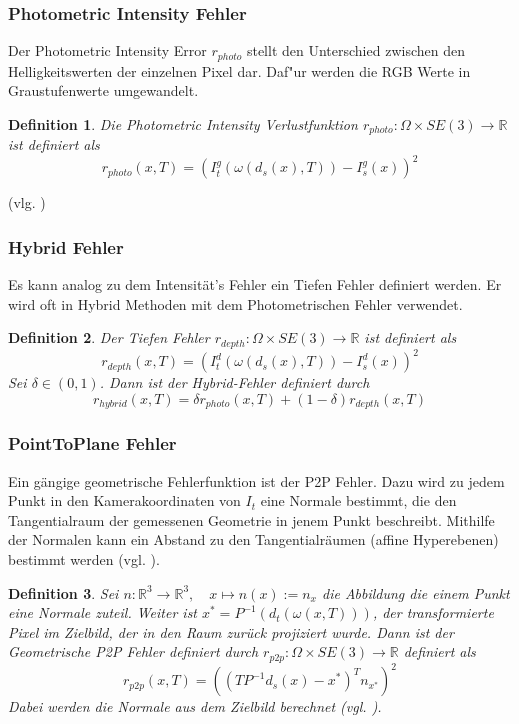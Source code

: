 \documentclass[12pt,DIV=15,BCOR=15mm,twoside,headsepline,abstract=true,listof=totoc,bibliography=totoc]{scrreprt}
\newtheorem{defi}{Definition}
\theoremstyle{remark}    %
\begin{document}
    \subsubsection{Photometric Intensity Fehler}
    
    Der Photometric Intensity Error $r_{photo}$ stellt den Unterschied zwischen den Helligkeitswerten der einzelnen Pixel dar. Daf"ur werden die RGB Werte
    in Graustufenwerte umgewandelt.
    \begin{defi}
        Die Photometric Intensity Verlustfunktion $r_{photo}:\Omega \times SE(3) \to \mathbb{R}$ ist definiert als 
        \[
        r_{photo}(x, T) = ( I_t^g(\omega(d_s(x), T)) - I_s^g(x))^2
        \]
    \end{defi} \noindent (vlg. \cite{Park_2017_ICCV,steinbruecker2011real})

    \subsubsection{Hybrid Fehler}
    Es kann analog zu dem Intensität's Fehler ein Tiefen Fehler definiert werden. Er wird oft in Hybrid Methoden mit dem Photometrischen Fehler verwendet. 
    \begin{defi}
        Der Tiefen Fehler $r_{depth}:\Omega \times SE(3) \to \mathbb{R}$ ist definiert als
        \[
            r_{depth}(x,T)= (I_t^d(\omega(d_s(x), T)) - I_s^d(x))^2
        \]
        Sei $\delta \in (0,1)$. Dann ist der Hybrid-Fehler definiert durch 
        \[
            r_{hybrid}(x,T)= \delta r_{photo}(x, T) + (1-\delta)r_{depth}(x,T)
        \]
    \end{defi} 
    
    \subsubsection{PointToPlane Fehler}
    Ein gängige geometrische Fehlerfunktion ist der \ac{P2P} Fehler.
    Dazu wird zu jedem Punkt in den Kamerakoordinaten von $I_t$ eine Normale bestimmt, die den Tangentialraum der gemessenen Geometrie in jenem Punkt
    beschreibt. Mithilfe der Normalen kann ein Abstand zu den Tangentialräumen (affine Hyperebenen) bestimmt werden (vgl. \cite{Park_2017_ICCV, Zhou2018}).
    \begin{defi}
        Sei $n:\mathbb{R}^3 \to \mathbb{R}^3, \hspace{1em} x \mapsto n(x):= n_x$ die Abbildung die einem Punkt eine Normale zuteil. 
        Weiter ist $x^* = P^{-1}(d_t(\omega(x, T)))$, der transformierte Pixel im Zielbild, der in den Raum zurück 
        projiziert wurde. Dann ist der Geometrische \ac{P2P} Fehler definiert durch
        $r_{p2p}:\Omega \times SE(3) \to \mathbb{R}$ definiert als
        \[
            r_{p2p}(x,T)= ((TP^{-1}d_s(x) - x^*)^Tn_{x^*})^2
        \]
        Dabei werden die Normale aus dem Zielbild berechnet (vgl. \cite{Park_2017_ICCV}). 
    \end{defi}
\end{document}
